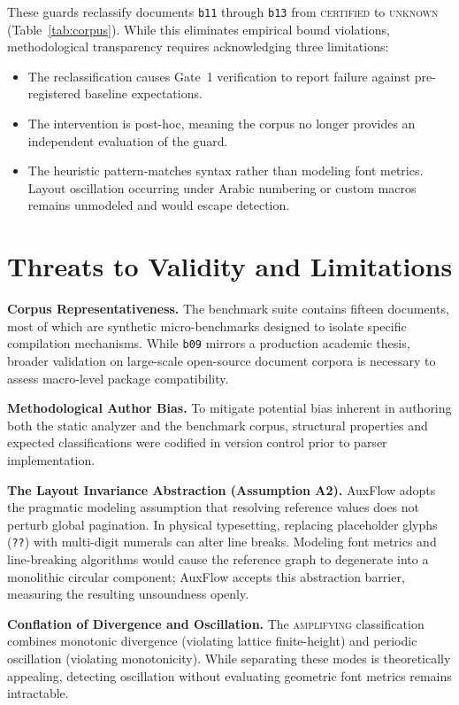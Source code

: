 \documentclass[conference]{IEEEtran}
\newcommand{\cls}[1]{\textsc{#1}}
\begin{document}
These guards reclassify documents \texttt{b11} through \texttt{b13} from \cls{certified} to \cls{unknown} (Table~\ref{tab:corpus}). While this eliminates empirical bound violations, methodological transparency requires acknowledging three limitations:
\begin{itemize}
\item The reclassification causes Gate~1 verification to report failure against pre-registered baseline expectations.
\item The intervention is post-hoc, meaning the corpus no longer provides an independent evaluation of the guard.
\item The heuristic pattern-matches syntax rather than modeling font metrics. Layout oscillation occurring under Arabic numbering or custom macros remains unmodeled and would escape detection.
\end{itemize}

\section{Threats to Validity and Limitations}

\textbf{Corpus Representativeness.}
The benchmark suite contains fifteen documents, most of which are synthetic micro-benchmarks designed to isolate specific compilation mechanisms. While \texttt{b09} mirrors a production academic thesis, broader validation on large-scale open-source document corpora is necessary to assess macro-level package compatibility.

\textbf{Methodological Author Bias.}
To mitigate potential bias inherent in authoring both the static analyzer and the benchmark corpus, structural properties and expected classifications were codified in version control prior to parser implementation.

\textbf{The Layout Invariance Abstraction (Assumption A2).}
AuxFlow adopts the pragmatic modeling assumption that resolving reference values does not perturb global pagination. In physical typesetting, replacing placeholder glyphs (\texttt{??}) with multi-digit numerals can alter line breaks. Modeling font metrics and line-breaking algorithms would cause the reference graph to degenerate into a monolithic circular component; AuxFlow accepts this abstraction barrier, measuring the resulting unsoundness openly.

\textbf{Conflation of Divergence and Oscillation.}
The \cls{amplifying} classification combines monotonic divergence (violating lattice finite-height) and periodic oscillation (violating monotonicity). While separating these modes is theoretically appealing, detecting oscillation without evaluating geometric font metrics remains intractable.
\end{document}
